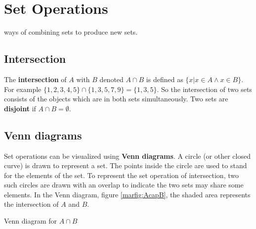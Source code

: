 \chapter{Set Operations}

\def\firstcircle{(0,0) circle (1.5cm)}
\def\secondcircle{(0:2cm) circle (1.5cm)}
\def\universebox{ (-2,-1.75) rectangle (3.75,1.75);}




 ways of combining sets to produce new sets.
 
\section{Intersection}
The { \bfseries intersection} of $A$ with $B$ denoted $A\cap B$ is defined as 
$\{x | x\in A \wedge x\in B\}$.
For example $\{1,2,3,4,5\}\cap \{1,3,5,7,9\}=\{1,3,5\}$. So the intersection of 
two sets consists of the objects
which are in both sets simultaneously. Two sets are { \bfseries disjoint} if $A\cap B=\emptyset$.

\section{Venn diagrams}
Set operations can be visualized using { \bfseries Venn diagrams}. A circle (or other closed
curve) is
drawn to represent a set. The points inside the circle are used to stand for the 
elements of the set.
To represent the set operation of intersection, two such circles are drawn with an
overlap to indicate the two sets may share some elements. In the Venn diagram, figure \ref{marfig:AcapB}, 
the shaded area represents the intersection of $A$ and $B$. 

\begin{marginfigure}[-3.5cm]
\caption{Venn diagram for $A \cap B$}\label{marfig:AcapB}
\end{marginfigure}

